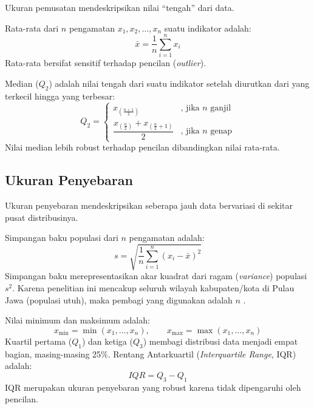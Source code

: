 Ukuran pemusatan mendeskripsikan nilai ``tengah'' dari data.

\begin{definition}
  Rata-rata dari $n$ pengamatan $x_1, x_2, \ldots, x_n$ suatu indikator adalah:
  \begin{equation} \label{eq:mean}
    \bar{x} = \frac{1}{n} \sum_{i=1}^{n} x_i
  \end{equation}
  Rata-rata bersifat sensitif terhadap pencilan (\textit{outlier}).
\end{definition}

\begin{definition}[Median]
  Median ($Q_2$) adalah nilai tengah dari suatu indikator setelah diurutkan dari yang terkecil hingga yang terbesar:
  \begin{equation} \label{eq:median}
    Q_2 = \begin{cases}
      x_{\left(\frac{n+1}{2}\right)} & \text{, jika } n \text{ ganjil} \\
      \dfrac{x_{\left(\frac{n}{2}\right)} + x_{\left(\frac{n}{2}+1\right)}}{2} & \text{, jika } n \text{ genap}
    \end{cases}
  \end{equation}
  Nilai median lebih robust terhadap pencilan dibandingkan nilai rata-rata.
\end{definition}

\subsection{\normalsize Ukuran Penyebaran}

Ukuran penyebaran mendeskripsikan seberapa jauh data bervariasi di sekitar pusat distribusinya.

\begin{definition}
  Simpangan baku populasi dari $n$ pengamatan adalah:
  \begin{equation} \label{eq:std_dev}
    s = \sqrt{\frac{1}{n} \sum_{i=1}^{n} (x_i - \bar{x})^2}
  \end{equation}
  Simpangan baku merepresentasikan akar kuadrat dari ragam (\textit{variance}) populasi $s^2$. Karena penelitian ini mencakup seluruh wilayah kabupaten/kota di Pulau Jawa (populasi utuh), maka pembagi yang digunakan adalah $n$ \citep{johnson2007}.
\end{definition}

\begin{definition}
  Nilai minimum dan maksimum adalah:
  \begin{equation} \label{eq:minmax}
    x_{\min} = \min(x_1, \ldots, x_n), \qquad x_{\max} = \max(x_1, \ldots, x_n)
  \end{equation}
  Kuartil pertama ($Q_1$) dan ketiga ($Q_3$) membagi distribusi data menjadi empat bagian, masing-masing 25\%. Rentang Antarkuartil (\textit{Interquartile Range}, IQR) adalah:
  \begin{equation}
    IQR = Q_3 - Q_1
  \end{equation}
  IQR merupakan ukuran penyebaran yang robust karena tidak dipengaruhi oleh pencilan.
\end{definition}


